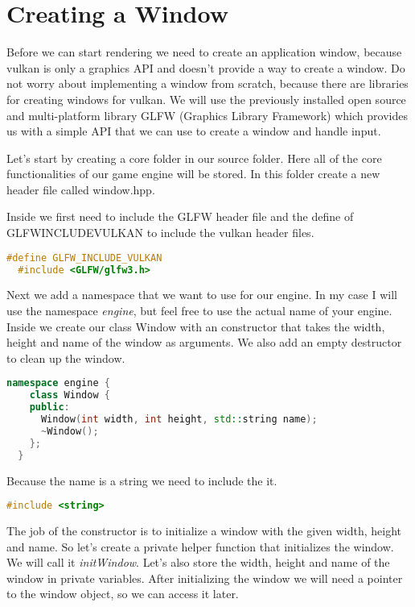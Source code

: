 \documentclass[12pt]{report} \usepackage{preamble}
\begin{document}
\section{Creating a Window}

Before we can start rendering we need to create an application window, because vulkan is only a graphics API and doesn't provide a way to create a window.
Do not worry about implementing a window from scratch, because there are libraries for creating windows for vulkan. We will use the
previously installed open source and multi-platform library GLFW (Graphics Library Framework)
which provides us with a simple API that we can use to create a window and handle input. \cite{glfw}

Let's start by creating a core folder in our source folder. Here all of the core functionalities
of our game engine will be stored. In this folder create a new header file called window.hpp.

Inside we first need to include the GLFW header file and the define of \\
GLFW\textunderscore INCLUDE\textunderscore VULKAN to include the vulkan header files.

\begin{lstlisting}[language=C++, caption = {Include GLFW and Vulkan}]
  #define GLFW_INCLUDE_VULKAN
  #include <GLFW/glfw3.h>
\end{lstlisting}

Next we add a namespace that we want to use for our engine. In my case I will use
the namespace \textit{engine}, but feel free to use the actual name of your engine.
Inside we create our class Window with an constructor that takes the width, height
and name of the window as arguments. We also add an empty destructor to clean up the window.

\begin{lstlisting}[language=C++, caption = {Window Class}]
  namespace engine {
    class Window {
    public:
      Window(int width, int height, std::string name);
      ~Window();
    };
  }
\end{lstlisting}

Because the name is a string we need to include the it.

\begin{lstlisting}[language=C++, caption = {Include String}]
  #include <string>
\end{lstlisting}

The job of the constructor is to initialize a window with the given width, height and name.
So let's create a private helper function that initializes the window. We will call it
\textit{initWindow}. Let's also store the width, height and name of the window in private variables.
After initializing the window we will need a pointer to the window object, so we can access it later.
\end{document}
